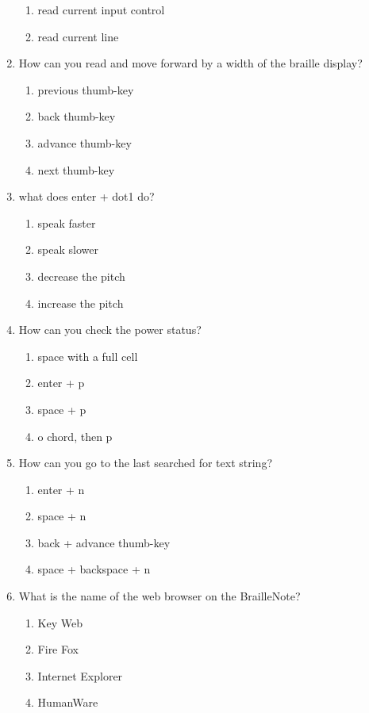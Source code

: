 \documentclass[10pt,letterpaper,twoside]{report}
\begin{document}
\begin{enumerate}
\begin{enumerate}
		      \item read current input control
		      \item read current line
	      \end{enumerate}
	\item How can you read and move forward by a width of the braille display?
	      \begin{enumerate}
		      \item previous thumb-key
		      \item back thumb-key
		      \item advance thumb-key
		      \item next thumb-key
	      \end{enumerate}
	\item what does enter + dot1 do?
	      \begin{enumerate}
		      \item speak faster
		      \item speak slower
		      \item decrease the pitch
		      \item increase the pitch
	      \end{enumerate}
	\item How can you check the power status?
	      \begin{enumerate}
		      \item space with a full cell
		      \item enter + p
		      \item space + p
		      \item o chord, then p
	      \end{enumerate}
	\item How can you go to the last searched for text string?
	      \begin{enumerate}
		      \item enter + n
		      \item space + n
		      \item back + advance thumb-key
		      \item space + backspace + n
	      \end{enumerate}
	\item What is the name of the web browser on the BrailleNote?
	      \begin{enumerate}
		      \item Key Web
		      \item Fire Fox
		      \item Internet Explorer
		      \item HumanWare
	      \end{enumerate}
\end{enumerate}
\end{document}
